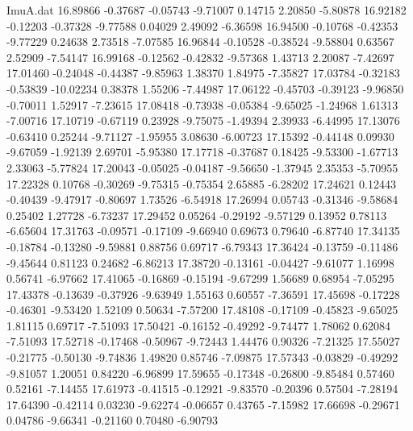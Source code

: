 \begin{filecontents}{ImuA.dat}
  16.89866   -0.37687   -0.05743   -9.71007    0.14715    2.20850   -5.80878
  16.92182   -0.12203   -0.37328   -9.77588    0.04029    2.49092   -6.36598
  16.94500   -0.10768   -0.42353   -9.77229    0.24638    2.73518   -7.07585
  16.96844   -0.10528   -0.38524   -9.58804    0.63567    2.52909   -7.54147
  16.99168   -0.12562   -0.42832   -9.57368    1.43713    2.20087   -7.42697
  17.01460   -0.24048   -0.44387   -9.85963    1.38370    1.84975   -7.35827
  17.03784   -0.32183   -0.53839  -10.02234    0.38378    1.55206   -7.44987
  17.06122   -0.45703   -0.39123   -9.96850   -0.70011    1.52917   -7.23615
  17.08418   -0.73938   -0.05384   -9.65025   -1.24968    1.61313   -7.00716
  17.10719   -0.67119    0.23928   -9.75075   -1.49394    2.39933   -6.44995
  17.13076   -0.63410    0.25244   -9.71127   -1.95955    3.08630   -6.00723
  17.15392   -0.44148    0.09930   -9.67059   -1.92139    2.69701   -5.95380
  17.17718   -0.37687    0.18425   -9.53300   -1.67713    2.33063   -5.77824
  17.20043   -0.05025   -0.04187   -9.56650   -1.37945    2.35353   -5.70955
  17.22328    0.10768   -0.30269   -9.75315   -0.75354    2.65885   -6.28202
  17.24621    0.12443   -0.40439   -9.47917   -0.80697    1.73526   -6.54918
  17.26994    0.05743   -0.31346   -9.58684    0.25402    1.27728   -6.73237
  17.29452    0.05264   -0.29192   -9.57129    0.13952    0.78113   -6.65604
  17.31763   -0.09571   -0.17109   -9.66940    0.69673    0.79640   -6.87740
  17.34135   -0.18784   -0.13280   -9.59881    0.88756    0.69717   -6.79343
  17.36424   -0.13759   -0.11486   -9.45644    0.81123    0.24682   -6.86213
  17.38720   -0.13161   -0.04427   -9.61077    1.16998    0.56741   -6.97662
  17.41065   -0.16869   -0.15194   -9.67299    1.56689    0.68954   -7.05295
  17.43378   -0.13639   -0.37926   -9.63949    1.55163    0.60557   -7.36591
  17.45698   -0.17228   -0.46301   -9.53420    1.52109    0.50634   -7.57200
  17.48108   -0.17109   -0.45823   -9.65025    1.81115    0.69717   -7.51093
  17.50421   -0.16152   -0.49292   -9.74477    1.78062    0.62084   -7.51093
  17.52718   -0.17468   -0.50967   -9.72443    1.44476    0.90326   -7.21325
  17.55027   -0.21775   -0.50130   -9.74836    1.49820    0.85746   -7.09875
  17.57343   -0.03829   -0.49292   -9.81057    1.20051    0.84220   -6.96899
  17.59655   -0.17348   -0.26800   -9.85484    0.57460    0.52161   -7.14455
  17.61973   -0.41515   -0.12921   -9.83570   -0.20396    0.57504   -7.28194
  17.64390   -0.42114    0.03230   -9.62274   -0.06657    0.43765   -7.15982
  17.66698   -0.29671    0.04786   -9.66341   -0.21160    0.70480   -6.90793

\end{filecontents}
